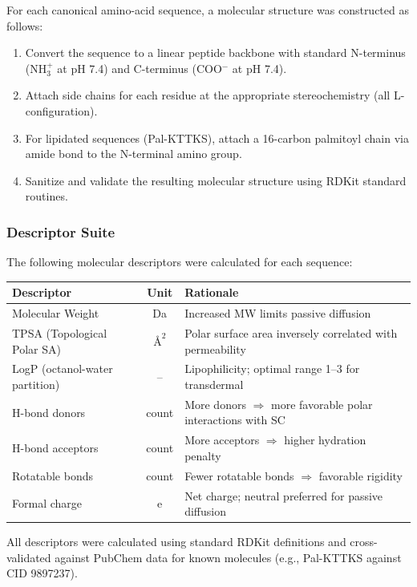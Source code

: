 \documentclass[11pt,a4paper]{article}
\begin{document}
For each canonical amino-acid sequence, a molecular structure was constructed as follows:
\begin{enumerate}
  \item Convert the sequence to a linear peptide backbone with standard N-terminus (NH$_3^+$ at pH 7.4) and C-terminus (COO$^-$ at pH 7.4).
  \item Attach side chains for each residue at the appropriate stereochemistry (all L-configuration).
  \item For lipidated sequences (Pal-KTTKS), attach a 16-carbon palmitoyl chain via amide bond to the N-terminal amino group.
  \item Sanitize and validate the resulting molecular structure using RDKit standard routines.
\end{enumerate}

\subsubsection{Descriptor Suite}

The following molecular descriptors were calculated for each sequence:

\begin{table}[H]
\centering
\small
\begin{tabular}{lcl}
\toprule
\textbf{Descriptor} & \textbf{Unit} & \textbf{Rationale} \\
\midrule
Molecular Weight & Da & Increased MW limits passive diffusion \\
TPSA (Topological Polar SA) & $\text{\AA}^2$ & Polar surface area inversely correlated with permeability \\
LogP (octanol-water partition) & -- & Lipophilicity; optimal range 1--3 for transdermal \\
H-bond donors & count & More donors $\Rightarrow$ more favorable polar interactions with SC \\
H-bond acceptors & count & More acceptors $\Rightarrow$ higher hydration penalty \\
Rotatable bonds & count & Fewer rotatable bonds $\Rightarrow$ favorable rigidity \\
Formal charge & e & Net charge; neutral preferred for passive diffusion \\
\bottomrule
\end{tabular}
\end{table}

All descriptors were calculated using standard RDKit definitions and cross-validated against PubChem data for known molecules (e.g., Pal-KTTKS against CID 9897237).
\end{document}

